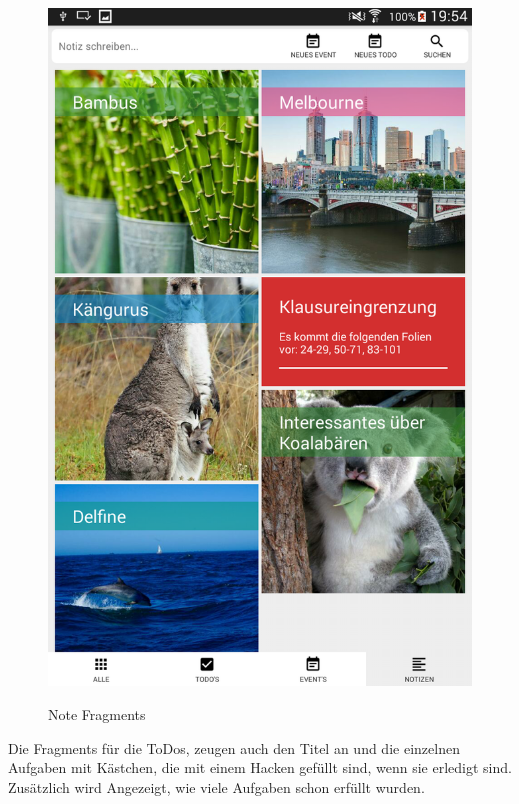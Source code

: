 \begin{figure}[H]
\centering
\begin{minipage}[t]{1\textwidth} %
\caption{Note Fragments} %
\includegraphics[width=1\textwidth]{img/FragmentN}\\ %
\end{minipage}
\end{figure}

Die Fragments für die ToDos, zeugen auch den Titel an und die einzelnen Aufgaben mit Kästchen, die mit einem Hacken gefüllt sind, wenn sie erledigt sind. Zusätzlich wird Angezeigt, wie viele Aufgaben schon erfüllt wurden.

